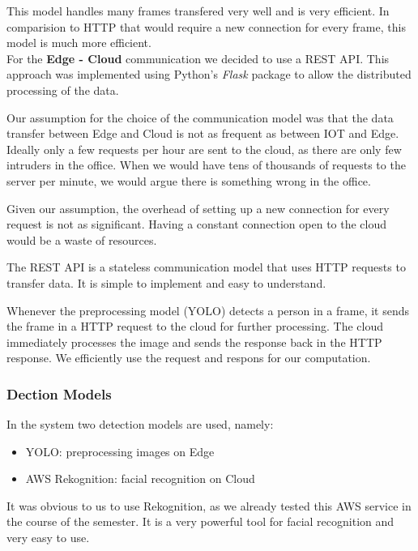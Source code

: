 \documentclass[conference]{IEEEtran}
\begin{document}
This model handles many frames transfered very well and is very efficient. In comparision to HTTP that would require a new connection for every frame, this model is much more efficient. 
\\


For the \textbf{Edge - Cloud} communication we decided to use a REST API. This approach was implemented using Python's \textit{Flask} package to allow the distributed processing of the data. 

Our assumption for the choice of the communication model was that the data transfer between Edge and Cloud is not as frequent as between IOT and Edge. Ideally only a few requests per hour are sent to the cloud, as there are only few intruders in the office. When we would have tens of thousands of requests to the server per minute, we would argue there is something wrong in the office. 

Given our assumption, the overhead of setting up a new connection for every request is not as significant. Having a constant connection open to the cloud would be a waste of resources. 

The REST API is a stateless communication model that uses HTTP requests to transfer data. It is simple to implement and easy to understand. 

Whenever the preprocessing model (YOLO) detects a person in a frame, it sends the frame in a HTTP request to the cloud for further processing. 
The cloud immediately processes the image and sends the response back in the HTTP response. We efficiently use the request and respons for our computation. 
\hfill \break

\subsubsection{Dection Models}
In the system two detection models are used, namely: 
\begin{itemize}
\item YOLO: preprocessing images on Edge
\item AWS Rekognition: facial recognition on Cloud
\end{itemize}

\hfill \break

It was obvious to us to use Rekognition, as we already tested this AWS service in the course of the semester. It is a very powerful tool for facial recognition and very easy to use. 
\end{document}
